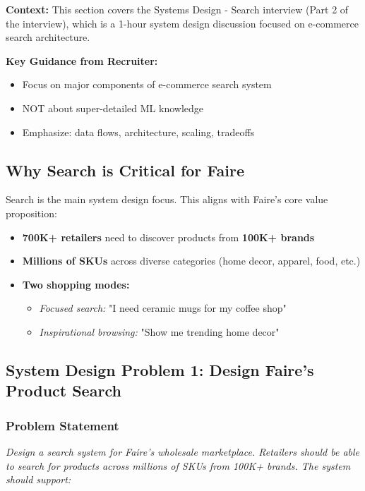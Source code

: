 \documentclass[11pt,letterpaper]{article}
\begin{document}
\textbf{Context:} This section covers the Systems Design - Search interview (Part 2 of the interview), which is a 1-hour system design discussion focused on e-commerce search architecture.

\textbf{Key Guidance from Recruiter:}
\begin{itemize}
    \item Focus on major components of e-commerce search system
    \item NOT about super-detailed ML knowledge
    \item Emphasize: data flows, architecture, scaling, tradeoffs
\end{itemize}

\subsection{Why Search is Critical for Faire}

Search is the main system design focus. This aligns with Faire's core value proposition:

\begin{itemize}
    \item \textbf{700K+ retailers} need to discover products from \textbf{100K+ brands}
    \item \textbf{Millions of SKUs} across diverse categories (home decor, apparel, food, etc.)
    \item \textbf{Two shopping modes:}
    \begin{itemize}
        \item \textit{Focused search:} "I need ceramic mugs for my coffee shop"
        \item \textit{Inspirational browsing:} "Show me trending home decor"
    \end{itemize}
\end{itemize}

\subsection{System Design Problem 1: Design Faire's Product Search}

\subsubsection{Problem Statement}

\textit{Design a search system for Faire's wholesale marketplace. Retailers should be able to search for products across millions of SKUs from 100K+ brands. The system should support:}
\end{document}
